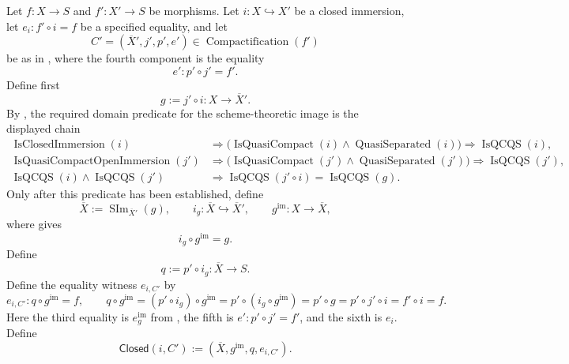 \begin{definition}
  \label{def:nagata-closed-subscheme-compactification}

  Let $f\colon X\to S$ and $f'\colon X'\to S$ be morphisms.  Let
  $i\colon X\hookrightarrow X'$ be a closed immersion, let
  $e_i\colon f'\circ i=f$ be a specified equality, and let
  \[
    C'=(\overline X',j',p',e')
      \in\operatorname{Compactification}(f')
  \]
  be as in , where the fourth component is
  the equality
  \[
    e'\colon p'\circ j'=f'.
  \]
  Define first
  \[
    g:=j'\circ i\colon X\to\overline X'.
  \]
  By ,
  the required domain predicate
  for the scheme-theoretic image is the displayed chain
  \[
  \begin{aligned}
    \operatorname{IsClosedImmersion}(i)
      &\Longrightarrow
        \bigl(
          \operatorname{IsQuasiCompact}(i)\wedge
          \operatorname{QuasiSeparated}(i)
        \bigr)
       \Longrightarrow\operatorname{IsQCQS}(i),\\
    \operatorname{IsQuasiCompactOpenImmersion}(j')
      &\Longrightarrow
        \bigl(
          \operatorname{IsQuasiCompact}(j')\wedge
          \operatorname{QuasiSeparated}(j')
        \bigr)
       \Longrightarrow\operatorname{IsQCQS}(j'),\\
    \operatorname{IsQCQS}(i)\wedge\operatorname{IsQCQS}(j')
      &\Longrightarrow
        \operatorname{IsQCQS}(j'\circ i)
       =\operatorname{IsQCQS}(g).
  \end{aligned}
  \]
  Only after this predicate has been established, define
  \[
    \overline X:=\operatorname{SIm}_{\overline X'}(g),
    \qquad
    i_g\colon\overline X\hookrightarrow\overline X',
    \qquad
    g^{\mathrm{im}}\colon X\to\overline X,
  \]
  where  gives
  \[
    i_g\circ g^{\mathrm{im}}=g.                                  \tag{CSC0}
  \]
  Define
  \[
    q:=p'\circ i_g\colon\overline X\to S.
  \]
  Define the equality witness $e_{i,C'}$ by
  \[
    e_{i,C'}\colon q\circ g^{\mathrm{im}}=f,
    \qquad
    q\circ g^{\mathrm{im}}
      =(p'\circ i_g)\circ g^{\mathrm{im}}
      =p'\circ(i_g\circ g^{\mathrm{im}})
      =p'\circ g
      =p'\circ j'\circ i
      =f'\circ i=f.
  \]
  Here the third equality is $e_g^{\mathrm{im}}$ from
  , the fifth is
  $e'\colon p'\circ j'=f'$, and the sixth is $e_i$.  Define
  \[
    \mathsf{Closed}(i,C'):=
      (\overline X,g^{\mathrm{im}},q,e_{i,C'}).
  \]
\end{definition}

